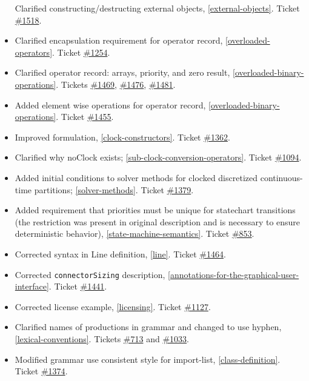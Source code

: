 \begin{itemize}
  Clarified constructing/destructing external objects, \cref{external-objects}.
  Ticket \href{https://github.com/modelica/ModelicaSpecification/issues/1518}{\#1518}.
\item
  Clarified encapsulation requirement for operator record, \cref{overloaded-operators}.
  Ticket \href{https://github.com/modelica/ModelicaSpecification/issues/1254}{\#1254}.
\item
  Clarified operator record: arrays, priority, and zero result,
  \cref{overloaded-binary-operations}. Tickets
  \href{https://github.com/modelica/ModelicaSpecification/issues/1469}{\#1469},
  \href{https://github.com/modelica/ModelicaSpecification/issues/1476}{\#1476},
  \href{https://github.com/modelica/ModelicaSpecification/issues/1481}{\#1481}.
\item
  Added element wise operations for operator record, \cref{overloaded-binary-operations}.
  Ticket \href{https://github.com/modelica/ModelicaSpecification/issues/1455}{\#1455}.
\item
  Improved formulation, \cref{clock-constructors}. Ticket
  \href{https://github.com/modelica/ModelicaSpecification/issues/1362}{\#1362}.
\item
  Clarified why noClock exists; \cref{sub-clock-conversion-operators}. Ticket
  \href{https://github.com/modelica/ModelicaSpecification/issues/1094}{\#1094}.
\item
  Added initial conditions to solver methods for clocked discretized
  continuous-time partitions; \cref{solver-methods}. Ticket
  \href{https://github.com/modelica/ModelicaSpecification/issues/1379}{\#1379}.
\item
  Added requirement that priorities must be unique for statechart
  transitions (the restriction was present in original description and
  is necessary to ensure deterministic behavior), \cref{state-machine-semantics}. Ticket
  \href{https://github.com/modelica/ModelicaSpecification/issues/853}{\#853}.
\item
  Corrected syntax in Line definition, \cref{line}. Ticket
  \href{https://github.com/modelica/ModelicaSpecification/issues/1464}{\#1464}.
\item
  Corrected \lstinline!connectorSizing! description, \cref{annotations-for-the-graphical-user-interface}. Ticket
  \href{https://github.com/modelica/ModelicaSpecification/issues/1441}{\#1441}.
\item
  Corrected license example, \cref{licensing}. Ticket
  \href{https://github.com/modelica/ModelicaSpecification/issues/1127}{\#1127}.
\item
  Clarified names of productions in grammar and changed to use hyphen,
  \cref{lexical-conventions}. Tickets
  \href{https://github.com/modelica/ModelicaSpecification/issues/713}{\#713} and
  \href{https://github.com/modelica/ModelicaSpecification/issues/1033}{\#1033}.
\item
  Modified grammar use consistent style for import-list, \cref{class-definition}.
  Ticket \href{https://github.com/modelica/ModelicaSpecification/issues/1374}{\#1374}.
\end{itemize}

